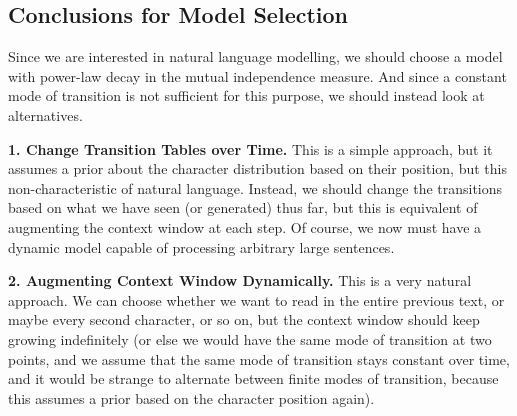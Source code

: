 \documentclass[../../main.tex]{subfiles}
\begin{document}


    \smallskip
\subsection{Conclusions for Model Selection}
    Since we are interested in natural language modelling, we should choose a model with power-law decay in the mutual independence measure. And since a constant mode of transition is not sufficient for this purpose, we should instead look at alternatives.

    \textbf{1. Change Transition Tables over Time.} This is a simple approach, but it assumes a prior about the character distribution based on their position, but this non-characteristic of natural language. Instead, we should change the transitions based on what we have seen (or generated) thus far, but this is equivalent of augmenting the context window at each step. Of course, we now must have a dynamic model capable of processing arbitrary large sentences.

    \textbf{2. Augmenting Context Window Dynamically.} This is a very natural approach. We can choose whether we want to read in the entire previous text, or maybe every second character, or so on, but the context window should keep growing indefinitely (or else we would have the same mode of transition at two points, and we assume that the same mode of transition stays constant over time, and it would be strange to alternate between finite modes of transition, because this assumes a prior based on the character position again).
    
\end{document}
